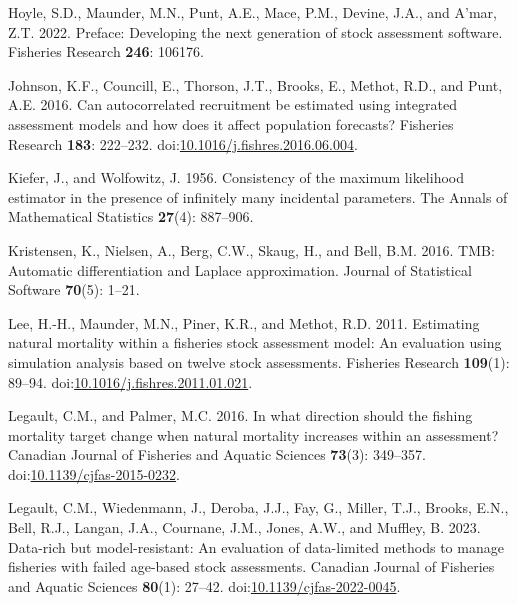 \documentclass[
  12pt,
]{article}
\newlength{\cslhangindent}
\newenvironment{CSLReferences}[2] %
 {\begin{list}{}{%
  \setlength{\itemindent}{0pt}
  \setlength{\leftmargin}{0pt}
  \setlength{\parsep}{0pt}
  \ifodd #1
   \setlength{\leftmargin}{\cslhangindent}
   \setlength{\itemindent}{-1\cslhangindent}
  \fi
  \setlength{\itemsep}{#2\baselineskip}}}
 {\end{list}}
\begin{document}
\begin{CSLReferences}{1}{0}
Hoyle, S.D., Maunder, M.N., Punt, A.E., Mace, P.M., Devine, J.A., and
A'mar, Z.T. 2022. Preface: Developing the next generation of stock
assessment software. Fisheries Research \textbf{246}: 106176.

Johnson, K.F., Councill, E., Thorson, J.T., Brooks, E., Methot, R.D.,
and Punt, A.E. 2016. Can autocorrelated recruitment be estimated using
integrated assessment models and how does it affect population
forecasts? Fisheries Research \textbf{183}: 222--232.
doi:\href{https://doi.org/10.1016/j.fishres.2016.06.004}{10.1016/j.fishres.2016.06.004}.

Kiefer, J., and Wolfowitz, J. 1956. Consistency of the maximum
likelihood estimator in the presence of infinitely many incidental
parameters. The Annals of Mathematical Statistics \textbf{27}(4):
887--906.

Kristensen, K., Nielsen, A., Berg, C.W., Skaug, H., and Bell, B.M. 2016.
{TMB}: Automatic differentiation and {L}aplace approximation. Journal of
Statistical Software \textbf{70}(5): 1--21.

Lee, H.-H., Maunder, M.N., Piner, K.R., and Methot, R.D. 2011.
Estimating natural mortality within a fisheries stock assessment model:
An evaluation using simulation analysis based on twelve stock
assessments. Fisheries Research \textbf{109}(1): 89--94.
doi:\href{https://doi.org/10.1016/j.fishres.2011.01.021}{10.1016/j.fishres.2011.01.021}.

Legault, C.M., and Palmer, M.C. 2016. In what direction should the
fishing mortality target change when natural mortality increases within
an assessment? Canadian Journal of Fisheries and Aquatic Sciences
\textbf{73}(3): 349--357.
doi:\href{https://doi.org/10.1139/cjfas-2015-0232}{10.1139/cjfas-2015-0232}.

Legault, C.M., Wiedenmann, J., Deroba, J.J., Fay, G., Miller, T.J.,
Brooks, E.N., Bell, R.J., Langan, J.A., Cournane, J.M., Jones, A.W., and
Muffley, B. 2023. Data-rich but model-resistant: An evaluation of
data-limited methods to manage fisheries with failed age-based stock
assessments. Canadian Journal of Fisheries and Aquatic Sciences
\textbf{80}(1): 27--42.
doi:\href{https://doi.org/10.1139/cjfas-2022-0045}{10.1139/cjfas-2022-0045}.


\end{CSLReferences}
\end{document}
